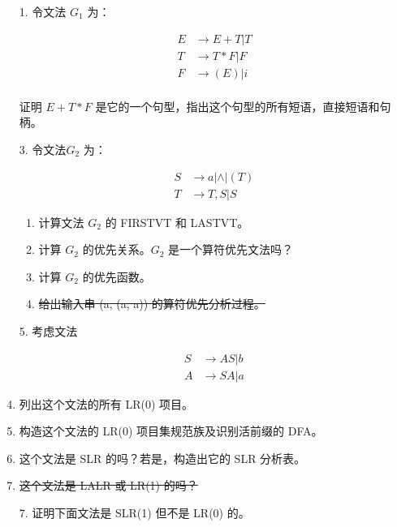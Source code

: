 \begin{enumerate}
    \item[1.] 令文法 $G_1$ 为：
    
    \begin{align*}
        E & \to E + T | T \\
        T & \to T * F | F \\
        F & \to (E) | i \\
    \end{align*}
    
    证明 $ E + T * F $ 是它的一个句型，指出这个句型的所有短语，直接短语和句柄。
    
    \item[3.] 令文法\footnotemark $G_2$ 为：
    
    
    \begin{align*}
        S & \to a | \wedge | (T) \\
        T & \to T, S | S 
    \end{align*}
    
    \begin{enumerate}
        \item 计算文法 $G_2$ 的 FIRSTVT 和 LASTVT。
        \item 计算 $G_2$ 的优先关系。$G_2$ 是一个算符优先文法吗？
        \item 计算 $G_2$ 的优先函数。
        \item \sout{给出输入串 (a, (a, a)) 的算符优先分析过程。}
    \end{enumerate}
    
    \item[5.] 考虑文法
    
    \begin{align*}
        S & \to AS | b \\
        A & \to SA | a
    \end{align*}
    
    \item 列出这个文法的所有 LR(0) 项目。
    \item 构造这个文法的 LR(0) 项目集规范族及识别活前缀的 DFA。
    \item 这个文法是 SLR 的吗？若是，构造出它的 SLR 分析表。
    \item \sout{这个文法是 LALR 或 LR(1) 的吗？}
    
    \item[7.] 证明下面文法是 SLR(1) 但不是 LR(0) 的。
    

\end{enumerate}
